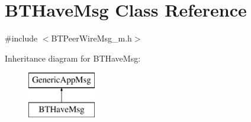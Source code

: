 \hypertarget{classBTHaveMsg}{}\section{B\+T\+Have\+Msg Class Reference}
\label{classBTHaveMsg}


{\ttfamily \#include $<$B\+T\+Peer\+Wire\+Msg\+\_\+m.\+h$>$}

Inheritance diagram for B\+T\+Have\+Msg\+:\begin{figure}[H]
\begin{center}
\leavevmode
\includegraphics[height=2.000000cm]{classBTHaveMsg}
\end{center}
\end{figure}
